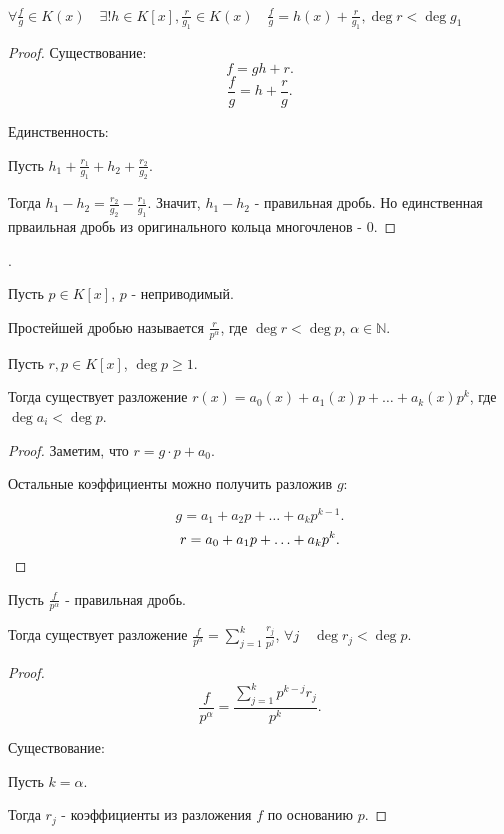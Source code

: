\begin{statement} \thmslashn

    $\forall{\frac{f}{g}\in K(x)}\quad \exists!{ h \in K[x], \frac{r}{g_1}\in K(x)}\quad \frac{f}{g} = h(x) + \frac{r}{g_1}, \deg r < \deg g_1$
    \begin{proof}
        Существование:
        \[ f = gh + r .\]
        \[ \frac{f}{g} = h + \frac{r}{g} .\] 
        
        Единственность:

        Пусть $h_1 + \frac{r_1}{g_1} + h_2 + \frac{r_2}{g_2}$.

        Тогда $h_1 - h_2 = \frac{r_2}{g_2} - \frac{r_1}{g_1}$. Значит, $h_1 - h_2$ - правильная дробь. Но единственная прваильная дробь из оригинального кольца многочленов - $0$.
    \end{proof}.
\end{statement}
\begin{definition} \thmslashn 

    Пусть $p\in K[x]$, $p$ - неприводимый.

    Простейшей дробью называется $\frac{r}{p^{\alpha}}$, где $\deg r < \deg p$, $\alpha\in \mathbb{N}$.
\end{definition}
\begin{lemma} \thmslashn

    Пусть $r, p\in K[x]$, $\deg p \ge 1$.

    Тогда существует разложение $r(x) = a_0(x) + a_1(x)p + \ldots + a_{k}(x)p^{k}$, где $\deg a_{i} < \deg p$.
    \begin{proof}
        Заметим, что $r = g\cdot p + a_0$.
        
        Остальные коэффициенты можно получить разложив $g$:

        \[ g = a_1 + a_2p + \ldots + a_{k}p^{k-1} .\]
        \[ r = a_0 + a_1p + \ldots + a_{k}p^{k} .\qedhere\] 
    \end{proof}
\end{lemma}
\begin{statement} \thmslashn

    Пусть $\frac{f}{p^{\alpha}}$ - правильная дробь.

    Тогда существует разложение $\frac{f}{p^{\alpha}} = \sum\limits_{j=1}^{k} \frac{r_{j}}{p^{j}}$, $\forall{j}\quad \deg r_{j} < \deg p$.
    \begin{proof}
        \[ \frac{f}{p^{\alpha}} = \frac{\sum\limits_{j=1}^{k} p^{k-j}r_{j}}{p^{k}} .\]

        Существование:

        Пусть $k=\alpha$.
        
        Тогда $r_j$ - коэффициенты из разложения $f$ по основанию $p$.
    \end{proof}
\end{statement}
